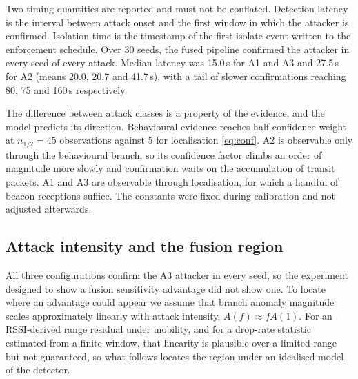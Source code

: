 \documentclass[pdflatex,sn-mathphys-num]{sn-jnl}%
\theoremstyle{thmstyleone}%
\theoremstyle{thmstyletwo}%
\theoremstyle{thmstylethree}%
\begin{document}
Two timing quantities are reported and must not be conflated. Detection
latency is the interval between attack onset and the first window in which the
attacker is confirmed. Isolation time is the timestamp of the first isolate
event written to the enforcement schedule. Over 30 seeds, the fused pipeline
confirmed the attacker in every seed of every attack. Median latency was
15.0\,s for A1 and A3 and 27.5\,s for A2 (means 20.0, 20.7 and 41.7\,s), with
a tail of slower confirmations reaching 80, 75 and 160\,s respectively.

The difference between attack classes is a property of the evidence, and the
model predicts its direction. Behavioural evidence reaches half confidence
weight at $n_{1/2} = 45$ observations against 5 for localisation
\eqref{eq:conf}. A2 is observable only through the behavioural branch, so its
confidence factor climbs an order of magnitude more slowly and confirmation
waits on the accumulation of transit packets. A1 and A3 are observable through
localisation, for which a handful of beacon receptions suffice. The constants were
fixed during calibration and not adjusted afterwards.

\subsection{Attack intensity and the fusion region}
\label{sec:region}

All three configurations confirm the A3 attacker in every seed, so the
experiment designed to show a fusion sensitivity advantage did not show one.
To locate where an advantage could appear we assume that branch anomaly
magnitude scales approximately linearly with attack intensity,
$A(f) \approx f A(1)$. For an RSSI-derived range residual under mobility, and
for a drop-rate statistic estimated from a finite window, that linearity is
plausible over a limited range but not guaranteed, so what follows locates the
region under an idealised model of the detector.
\end{document}
